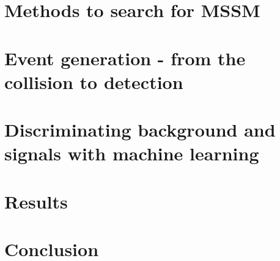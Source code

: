 \documentclass[12pt,a4paper]{report}
\begin{document}
\chapter{Methods to search for MSSM}


\chapter{Event generation - from the collision to detection}




\chapter{Discriminating background and signals with machine learning}


\chapter{Results}



\chapter{Conclusion}


\clearpage





\end{document}
